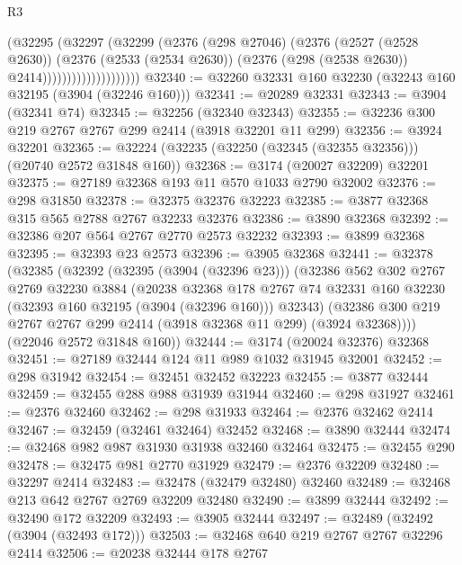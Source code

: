 \begin{lexlean}{R3}
\begin{coremodule}
                              (@32295
                                (@32297
                                  (@32299
                                    (@2376
                                      (@298 @27046)
                                      (@2376
                                        (@2527 (@2528 @2630))
                                        (@2376
                                          (@2533 (@2534 @2630))
                                          (@2376 (@298 (@2538 @2630)) @2414))))))))))))))))))))
@32340 := @32260 @32331 @160 @32230 (@32243 @160 @32195 (@3904 (@32246 @160)))
@32341 := @20289 @32331
@32343 := @3904 (@32341 @74)
@32345 := @32256 (@32340 @32343)
@32355 := @32236 @300 @219 @2767 @2767 @299 @2414 (@3918 @32201 @11 @299)
@32356 := @3924 @32201
@32365 := @32224 (@32235 (@32250 (@32345 (@32355 @32356))) (@20740 @2572 @31848 @160))
@32368 := @3174 (@20027 @32209) @32201
@32375 := @27189 @32368 @193 @11 @570 @1033 @2790 @32002
@32376 := @298 @31850
@32378 := @32375 @32376 @32223
@32385 := @3877 @32368 @315 @565 @2788 @2767 @32233 @32376
@32386 := @3890 @32368
@32392 := @32386 @207 @564 @2767 @2770 @2573 @32232
@32393 := @3899 @32368
@32395 := @32393 @23 @2573
@32396 := @3905 @32368
@32441 := @32378
    (@32385
      (@32392
        (@32395 (@3904 (@32396 @23)))
        (@32386
          @562
          @302
          @2767
          @2769
          @32230
          @3884
          (@20238
            @32368
            @178
            @2767
            @74
            @32331
            @160
            @32230
            (@32393 @160 @32195 (@3904 (@32396 @160)))
            @32343)
          (@32386 @300 @219 @2767 @2767 @299 @2414 (@3918 @32368 @11 @299) (@3924 @32368))))
      (@22046 @2572 @31848 @160))
@32444 := @3174 (@20024 @32376) @32368
@32451 := @27189 @32444 @124 @11 @989 @1032 @31945 @32001
@32452 := @298 @31942
@32454 := @32451 @32452 @32223
@32455 := @3877 @32444
@32459 := @32455 @288 @988 @31939 @31944
@32460 := @298 @31927
@32461 := @2376 @32460
@32462 := @298 @31933
@32464 := @2376 @32462 @2414
@32467 := @32459 (@32461 @32464) @32452
@32468 := @3890 @32444
@32474 := @32468 @982 @987 @31930 @31938 @32460 @32464
@32475 := @32455 @290
@32478 := @32475 @981 @2770 @31929
@32479 := @2376 @32209
@32480 := @32297 @2414
@32483 := @32478 (@32479 @32480) @32460
@32489 := @32468 @213 @642 @2767 @2769 @32209 @32480
@32490 := @3899 @32444
@32492 := @32490 @172 @32209
@32493 := @3905 @32444
@32497 := @32489 (@32492 (@3904 (@32493 @172)))
@32503 := @32468 @640 @219 @2767 @2767 @32296 @2414
@32506 := @20238 @32444 @178 @2767

\end{coremodule}
\end{lexlean}
